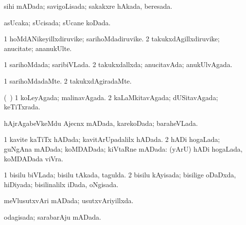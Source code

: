 {{\bentry
{} 
\gl{\gu}
\expl{}
\bmng
sihi mADada; savigoLisada; sakakxre hAkada, beresada. 
\emng
\eentry

\bentry
{} 
\gl{\gu}
\expl{}
\bmng
asUcaka; sUcisada; sUcane koDada. 
\emng
\eentry

\bentry
{} 
\gl{\nA}
\expl{}
\bmng
\bnum
\num{1} hoMdANikeyillxdiruvike; sarihoMdadiruvike. 
\num{2} takukxdAgillxdiruvike; anucitate; ananukUlte. 
\enum
\emng
\eentry

\bentry
{} 
\gl{\gu}
\expl{}
\bmng
\bnum
\num{1} sarihoMdada; saribiVLada. 
\num{2} takukxdallxda; anucitavAda; anukUlvAgada. 
\enum
\emng
\eentry

\bentry
{} 
\gl{\nA}
\expl{}
\bmng
{} 
\emng
\eentry

\bentry
{} 
\gl{\kirxvi}
\expl{}
\bmng
\bnum
\num{1} sarihoMdadaMte. 
\num{2} takukxdAgiradaMte. 
\enum
\emng
\eentry

\bentry
{} 
\gl{\gu}
\expl{}
\bmng
{} 
\emng
\eentry

\bentry
{} 
\gl{\gu}
\expl{}
\bmng
(\kanmu\ \kAparx) 
\bnum
\num{1} koLeyAgada; malinavAgada. 
\num{2} kaLaMkitavAgada; dUSitavAgada; keTiTxrada. 
\enum
\emng
\eentry

\bentry
{} 
\gl{\gu}
\expl{}
\bmng
hAjrAgabeVkeMdu Ajecnx mADada, karekoDada; baraheVLada. 
\emng
\eentry

\bentry
{} 
\gl{\gu}
\expl{}
\bmng
\bnum
\num{1} kavite kaTiTx hADada; kavitArUpadalilx hADada. 
\num{2} hADi hogaLada; guNgAna mADada; koMDADada; kiVtaRne mADada:  (yArU) hADi hogaLada, koMDADada viVra. 
\enum
\emng
\eentry

\bentry
{} 
\gl{\gu}
\expl{}
\bmng
\bnum
\num{1} bisilu biVLada; bisilu tAkada, tagulda. 
\num{2} bisilu kAyisada; bisilige oDaDxda, hiDiyada; bisilinalilx iDada, oNgisada. 
\enum
\emng
\eentry

\bentry
{} 
\gl{\gu}
\expl{}
\bmng
meVlusutxvAri mADada; usutxvAriyillxda. 
\emng
\eentry

\bentry
{} 
\gl{\gu}
\expl{}
\bmng
odagisada; sarabarAju mADada. 
\emng
\eentry

}}
